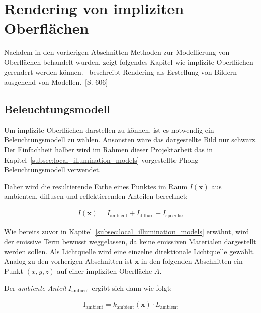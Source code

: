 
\section{Rendering von impliziten Oberflächen}
\label{sec:rendering_implicit_surfaces}

Nachdem in den vorherigen Abschnitten Methoden zur Modellierung von
Oberflächen behandelt wurden, zeigt folgendes Kapitel wie implizite
Oberflächen gerendert werden
können.~\citeauthor{glassner_introduction_1989 } beschreibt Rendering
als Erstellung von Bildern ausgehend von
Modellen.~\cite{glassner_introduction_1989}[S. 606]

\subsection{Beleuchtungsmodell}
\label{sec:rendering_implicit_surfaces_lighting}

Um implizite Oberflächen darstellen zu können, ist es notwendig ein
Beleuchtungsmodell zu wählen. Ansonsten wäre das dargestellte Bild nur schwarz.
Der Einfachheit halber wird im Rahmen dieser Projektarbeit das in
Kapitel~\ref{subsec:local_illumination_models} vorgestellte
Phong-Beleuchtungsmodell verwendet.

Daher wird die resultierende Farbe eines Punktes im Raum $I(\bm{x})$ aus
ambienten, diffusen und reflektierenden Anteilen berechnet:

\begin{gather}
    I(\bm{x}) = I_{\text{ambient}} + I_{\text{diffuse}} + I_{\text{specular}}
\end{gather}

Wie bereits zuvor in Kapitel~\ref{subsec:local_illumination_models} erwähnt,
wird der emissive Term bewusst weggelassen, da keine emissiven Materialen
dargestellt werden sollen. Als Lichtquelle wird eine einzelne direktionale
Lichtquelle gewählt. Analog zu den vorherigen Abschnitten ist $\bm{x}$
in den folgenden Abschnitten ein Punkt $(x, y, z)$ auf einer impliziten
Oberfläche $A$.

Der \textit{ambiente Anteil} $I_{\text{ambient}}$ ergibt sich dann wie
folgt:

\begin{gather}
    \text{I}_{\text{ambient}} = k_{\text{ambient}}(\bm{x}) \cdot L_{\text{ambient}}
\end{gather}

